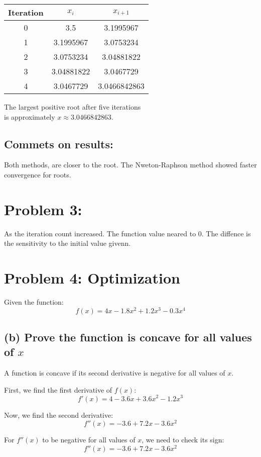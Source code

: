 \documentclass[12pt]{article}
\begin{document}
\begin{center}
    \begin{tabular}{||c c c||} 
     \hline
     Iteration & $x_i$ & $x_{i+1}$ \\ [0.5ex] 
     \hline\hline
     0 & 3.5 & 3.1995967\\ 
     \hline
     1 & 3.1995967 & 3.0753234  \\
     \hline
     2 & 3.0753234 & 3.04881822 \\
     \hline
     3 & 3.04881822 & 3.0467729 \\
     \hline
     4 & 3.0467729 & 3.0466842863 \\
     \hline
    \end{tabular}
\end{center}

The largest positive root after five iterations \\
is approximately \(x \approx 3.0466842863\).

\subsection*{Commets on results: }Both methods, are closer to the root. The Nweton-Raphson method showed faster convergence for roots. 
\section*{Problem 3:}
As the iteration count increased. The function value neared to 0. The diffence is the sensitivity to the initial value givenn. 
\section*{Problem 4: Optimization}

Given the function:
\[
f(x) = 4x - 1.8x^2 + 1.2x^3 - 0.3x^4
\]

\subsection*{(b) Prove the function is concave for all values of \(x\)}

A function is concave if its second derivative is negative for all values of \(x\).

First, we find the first derivative of \(f(x)\):
\[
f'(x) = 4 - 3.6x + 3.6x^2 - 1.2x^3
\]

Now, we find the second derivative:
\[
f''(x) = -3.6 + 7.2x - 3.6x^2
\]

For \(f''(x)\) to be negative for all values of \(x\), we need to check its sign:
\[
f''(x) = -3.6 + 7.2x - 3.6x^2
\]
\end{document}
